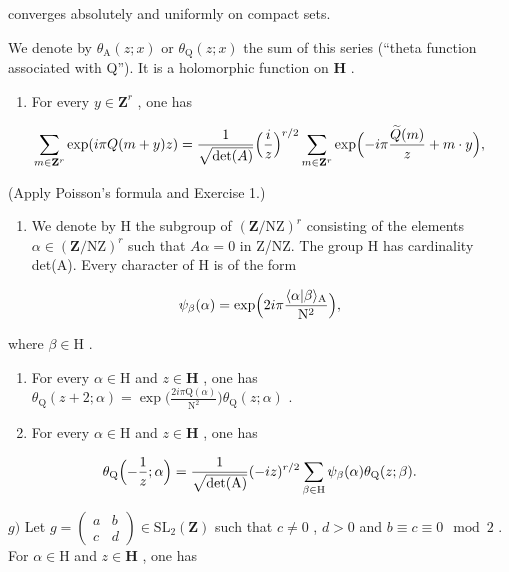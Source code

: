 converges absolutely and uniformly on compact sets.

We denote by \(\theta_{\mathrm{A}}(z;x)\) or \(\theta_{\mathrm{Q}}(z;x)\) the sum of this series (“theta function associated with Q”). It is a holomorphic function on \(\mathbf{H}\) .

\begin{enumerate}
\def\labelenumi{\alph{enumi})}
\setcounter{enumi}{2}
\tightlist
\item
  For every \(y \in \mathbf{Z}^r\) , one has
\end{enumerate}

\[
\sum_ {m \in {\bf Z} ^ {r}} \exp (i \pi Q (m + y) z) = \frac {1}{\sqrt {\det (A)}} \Bigl (\frac {i}{z} \Bigr) ^ {r / 2} \sum_ {m \in {\bf Z} ^ {r}} \exp \Bigl (- i \pi \frac {\widetilde {Q} (m)}{z} + m \cdot y \Bigr),
\]

(Apply Poisson's formula and Exercise 1.)

\begin{enumerate}
\def\labelenumi{\alph{enumi})}
\setcounter{enumi}{3}
\tightlist
\item
  We denote by H the subgroup of \((\mathbf{Z}/\mathrm{NZ})^{r}\) consisting of the elements \(\alpha\in(\mathbf{Z}/\mathrm{NZ})^{r}\) such that \(A\alpha=0\) in Z/NZ. The group H has cardinality det(A). Every character of H is of the form
\end{enumerate}

\[
\psi_ {\beta} (\alpha) = \exp \Bigl (2 i \pi \frac {\langle \alpha | \beta \rangle_ {\mathrm{A}}}{\mathrm{N} ^ {2}} \Bigr),
\]

where \(\beta\in\mathrm{H}\) .

\begin{enumerate}
\def\labelenumi{\alph{enumi})}
\setcounter{enumi}{4}
\item
  For every \(\alpha \in \mathrm{H}\) and \(z\in \mathbf{H}\) , one has \(\theta_{\mathrm{Q}}(z + 2;\alpha) = \exp \bigl (\frac{2i\pi\mathrm{Q}(\alpha)}{\mathrm{N}^2}\bigr)\theta_{\mathrm{Q}}(z;\alpha)\) .
\item
  For every \(\alpha \in \mathrm{H}\) and \(z\in \mathbf{H}\) , one has
\end{enumerate}

\[
\theta_ {\mathrm{Q}} \Bigl (- \frac {1}{z}; \alpha \Bigr) = \frac {1}{\sqrt {\det (\mathrm{A})}} (- i z) ^ {r / 2} \sum_ {\beta \in \mathrm{H}} \psi_ {\beta} (\alpha) \theta_ {\mathrm{Q}} (z; \beta).
\]

\(g)\) Let \(g = \begin{pmatrix} a & b \\ c & d \end{pmatrix} \in \mathrm{SL}_2(\mathbf{Z})\) such that \(c \neq 0\) , \(d > 0\) and \(b \equiv c \equiv 0 \mod 2\) . For \(\alpha \in \mathrm{H}\) and \(z \in \mathbf{H}\) , one has

